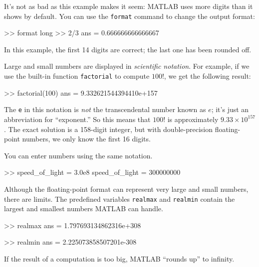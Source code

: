 It's not as bad as this example makes it seem: MATLAB uses more digits than it shows by default.
You can use the \lstinline{format} command to change the output format:


\begin{code}
>> format long
>> 2/3
ans = 0.666666666666667
\end{code}

In this example, the first 14 digits are correct; the last one has been rounded off.


Large and small numbers are displayed in \emph{scientific notation}.
For example, if we use the built-in function \lstinline{factorial} to compute $100!$, we get the following result:

\begin{code}
>> factorial(100)
ans = 9.332621544394410e+157
\end{code}

The \lstinline{e} in this notation is \emph{not} the transcendental number
known as $e$; it's just an abbreviation for ``exponent.''  So
this means that $100!$ is approximately $9.33 \times 10^{157}$.  The
exact solution is a 158-digit integer, but with double-precision floating-point numbers, we only know the first 16 digits.


You can enter numbers using the same notation.

\begin{code}
>> speed_of_light = 3.0e8
speed_of_light = 300000000
\end{code}

Although the floating-point format can represent very large and small numbers,
there are limits.
The predefined variables \lstinline{realmax} and \lstinline{realmin}
contain the largest and smallest numbers MATLAB
can handle.


\begin{code}
>> realmax
ans = 1.797693134862316e+308

>> realmin
ans = 2.225073858507201e-308
\end{code}

If the result of a computation is too big, MATLAB ``rounds up''
to \mbox{infinity}.

